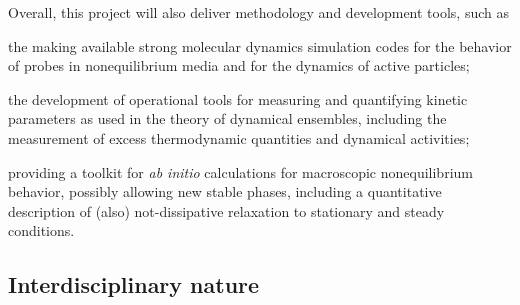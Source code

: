 Overall, this project will also deliver methodology and development tools, such as
\begin{inparaenum}[A.]
	\item the making available strong molecular dynamics simulation codes for the behavior of
	probes in nonequilibrium media and for the dynamics of active particles;
	\item the development of operational tools for measuring and quantifying kinetic parameters
	as used in the theory of dynamical ensembles, including the measurement of excess
	thermodynamic quantities and dynamical activities;
	\item providing a toolkit for {\it ab initio} calculations for macroscopic nonequilibrium
	behavior, possibly allowing new stable phases, including a quantitative description of
	(also) not-dissipative relaxation to stationary and steady conditions.
\end{inparaenum}


\subsection{Interdisciplinary nature}\label{sec:interdisc}

